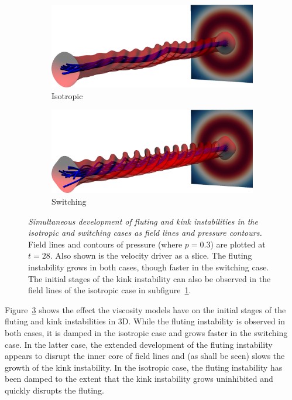 \documentclass[12pt]{article}
\newcommand{\mycaption}[2]{\caption[#1]{\emph{#1} #2}}
\begin{document}
\begin{figure}[t]
  \centering
    \begin{subfigure}{0.49\textwidth}
      \includegraphics[width=\linewidth]{field_line_plots/cropped/v-4r-4-isotropic_0014_cropped.png}
      \caption{Isotropic}
      \label{fig:field_line_plots_iso}
    \end{subfigure}
    \hfill
    \begin{subfigure}{0.49\textwidth}
      \includegraphics[width=\linewidth]{field_line_plots/cropped/v-4r-4-switching_0014_cropped.png}
      \caption{Switching}
      \label{fig:field_line_plots_swi}
    \end{subfigure}
\mycaption{Simultaneous development of fluting and kink instabilities in the isotropic and switching cases as field lines and pressure contours.}{Field lines and contours of pressure (where $p=0.3$) are plotted at $t=28$. Also shown is the velocity driver as a slice. The fluting instability grows in both cases, though faster in the switching case. The initial stages of the kink instability can also be observed in the field lines of the isotropic case in subfigure~\ref{fig:field_line_plots_iso}.}
\label{fig:kink_field_line_plots}%
\end{figure}

Figure~\ref{fig:kink_field_line_plots} shows the effect the viscosity models have on the initial stages of the fluting and kink instabilities in 3D. While the fluting instability is observed in both cases, it is damped in the isotropic case and grows faster in the switching case. In the latter case, the extended development of the fluting instability appears to disrupt the inner core of field lines and (as shall be seen) slows the growth of the kink instability. In the isotropic case, the fluting instability has been damped to the extent that the kink instability grows uninhibited and quickly disrupts the fluting.
\end{document}

